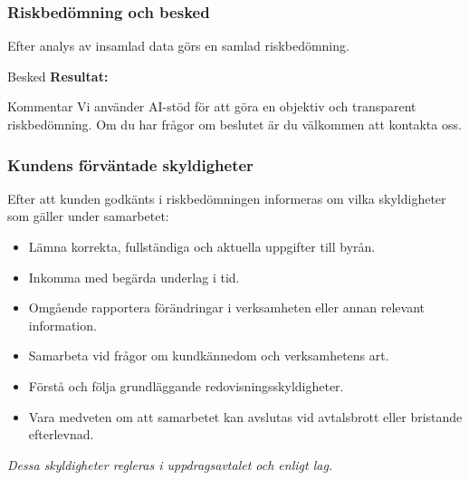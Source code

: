 \documentclass[10pt]{beamer}
\begin{document}
\begin{frame}[label=riskbesked]
  \frametitle{Riskbedömning och besked}
  \small
  Efter analys av insamlad data görs en samlad riskbedömning.\\
  \vspace{0.5cm}
  \begin{block}{Besked}
    \textbf{Resultat:} \underline{\hspace{6cm}} \\
  \end{block}
  \vspace{0.5cm}
  \begin{block}{Kommentar}
    Vi använder AI-stöd för att göra en objektiv och transparent riskbedömning. Om du har frågor om beslutet är du välkommen att kontakta oss.
  \end{block}
  \vspace{0.8cm}
  \begin{flushright}
    \hspace{0.5cm}
  \end{flushright}
\end{frame}

\begin{frame}
  \frametitle{Kundens förväntade skyldigheter}
  \small
  Efter att kunden godkänts i riskbedömningen informeras om vilka skyldigheter som gäller under samarbetet:
  \begin{itemize}
    \item Lämna korrekta, fullständiga och aktuella uppgifter till byrån.
    \item Inkomma med begärda underlag i tid.
    \item Omgående rapportera förändringar i verksamheten eller annan relevant information.
    \item Samarbeta vid frågor om kundkännedom och verksamhetens art.
    \item Förstå och följa grundläggande redovisningsskyldigheter.
    \item Vara medveten om att samarbetet kan avslutas vid avtalsbrott eller bristande efterlevnad.
  \end{itemize}
  \vspace{0.5cm}
  \textit{Dessa skyldigheter regleras i uppdragsavtalet och enligt lag.}
  \vspace{0.8cm}
  \begin{flushright}
  \end{flushright}
\end{frame}
\end{document}
